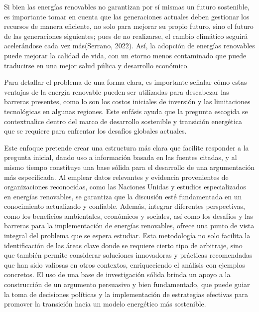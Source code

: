\documentclass[
  letterpaper,
  DIV=11,
  numbers=noendperiod]{scrreprt}
\begin{document}
Si bien las energías renovables no garantizan por sí mismas un futuro
sostenible, es importante tomar en cuenta que las generaciones actuales
deben gestionar los recursos de manera eficiente, no solo para mejorar
su propio futuro, sino el futuro de las generaciones siguientes; pues de
no realizarse, el cambio climático seguirá acelerándose cada vez
más(Serrano, 2022). Así, la adopción de energías renovables puede
mejorar la calidad de vida, con un etorno menos contaminado que puede
traducirse en una mejor salud púlica y desarrollo económico.

Para detallar el problema de una forma clara, es importante señalar cómo
estas ventajas de la energía renovable pueden ser utilizadas para
descabezar las barreras presentes, como lo son los costos iniciales de
inversión y las limitaciones tecnológicas en algunas regiones. Este
enfásis ayuda que la pregunta escogida se contextualice dentro del marco
de desarrollo sostenible y transición energética que se requiere para
enfrentar los desafíos globales actuales.

Este enfoque pretende crear una estructura más clara que facilite
responder a la pregunta inicial, dando uso a información basada en las
fuentes citadas, y al mismo tiempo constituye una base sólida para el
desarrollo de una argumentación más especificada. Al emplear datos
relevantes y evidencia provenientes de organizaciones reconocidas, como
las Naciones Unidas y estudios especializados en energías renovables, se
garantiza que la discusión esté fundamentada en un conocimiento
actualizado y confiable. Además, integrar diferentes perspectivas, como
los beneficios ambientales, económicos y sociales, así como los desafíos
y las barreras para la implementación de energías renovables, ofrece una
punto de vista integral del problema que se espera estudiar. Esta
metodología no solo facilita la identificación de las áreas clave donde
se requiere cierto tipo de arbitraje, sino que también permite
considerar soluciones innovadoras y prácticas recomendadas que han sido
valiosas en otros contextos, enriqueciendo el análisis con ejemplos
concretos. El uso de una base de investigación sólida brinda un apoyo a
la construcción de un argumento persuasivo y bien fundamentado, que
puede guiar la toma de decisiones políticas y la implementación de
estrategias efectivas para promover la transición hacia un modelo
energético más sostenible.
\end{document}
